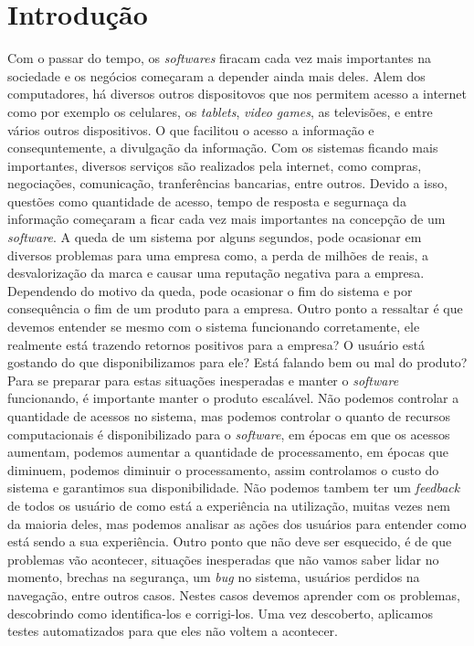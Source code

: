\chapter{Introdução}

  Com o passar do tempo, os \textit{softwares} firacam cada vez mais importantes
  na sociedade e os negócios começaram a depender ainda mais deles. Alem dos
  computadores, há diversos outros dispositovos que nos permitem acesso a internet
  como por exemplo os celulares, os \textit{tablets}, \textit{video games},
  as televisões, e entre vários outros dispositivos. O que facilitou o acesso a
  informação e consequntemente, a divulgação da informação. Com os sistemas ficando
  mais importantes, diversos serviços são realizados pela internet, como compras,
  negociações, comunicação, tranferências bancarias, entre outros.\newline
  Devido a isso, questões como quantidade de acesso, tempo de resposta e segurnaça
  da informação começaram a ficar cada vez mais importantes na concepção de um
  \textit{software}. A queda de um sistema por alguns segundos, pode ocasionar
  em diversos problemas para uma empresa como, a perda de milhões de reais,
  a desvalorização da marca e causar uma reputação negativa para a empresa.
  Dependendo do motivo da queda, pode ocasionar o fim do sistema e por consequência
  o fim de um produto para a empresa. Outro ponto a ressaltar é que devemos entender
  se mesmo com o sistema funcionando corretamente, ele realmente está trazendo retornos
  positivos para a empresa? O usuário está gostando do que disponibilizamos para ele?
  Está falando bem ou mal do produto? \newline
  Para se preparar para estas situações inesperadas e manter o \textit{software}
  funcionando, é importante manter o produto escalável. Não podemos controlar a
  quantidade de acessos no sistema, mas podemos controlar o quanto de recursos
  computacionais é disponibilizado para o \textit{software}, em épocas em que os
  acessos aumentam, podemos aumentar a quantidade de processamento, em épocas que
  diminuem, podemos diminuir o processamento, assim controlamos o custo do sistema
  e garantimos sua disponibilidade. Não podemos tambem ter um \textit{feedback}
  de todos os usuário de como está a experiência na utilização, muitas vezes nem
  da maioria deles, mas podemos analisar as ações dos usuários para entender
  como está sendo a sua experiência. \newline
  Outro ponto que não deve ser esquecido, é de que problemas vão acontecer,
  situações inesperadas que não vamos saber lidar no momento, brechas na segurança,
  um \textit{bug} no sistema, usuários perdidos na navegação, entre outros casos.
  Nestes casos devemos aprender com os problemas, descobrindo como identifica-los e
  corrigi-los. Uma vez descoberto, aplicamos testes automatizados para que eles não
  voltem a acontecer.
